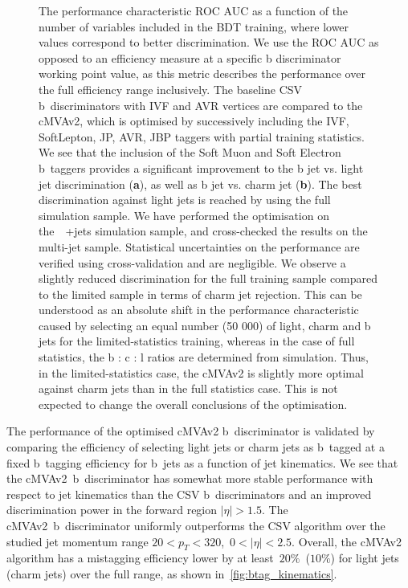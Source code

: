 \begin{figure}
\begin{centering}
\caption[The cMVAv2 performance as a function of training variables.]{The performance characteristic ROC AUC as a function of the number of variables included in the BDT training, where lower values correspond to better discrimination. We use the ROC AUC as opposed to an efficiency measure at a specific b discriminator working point value, as this metric describes the performance over the full efficiency range inclusively. The baseline CSV b~discriminators with IVF and AVR vertices are compared to the cMVAv2, which is optimised by successively including the IVF, SoftLepton, JP, AVR, JBP taggers with partial training statistics. We see that the inclusion of the Soft Muon and Soft Electron b~taggers provides a significant improvement to the b jet vs. light jet discrimination (\textbf{a}), as well as b jet vs. charm jet (\textbf{b}). The best discrimination against light jets is reached by using the full simulation sample. We have performed the optimisation on the~\ttbar~+jets simulation sample, and cross-checked the results on the multi-jet sample. Statistical uncertainties on the performance are verified using cross-validation and are negligible. We observe a slightly reduced discrimination for the full training sample compared to the limited sample in terms of charm jet rejection. This can be understood as an absolute shift in the performance characteristic caused by selecting an equal number (50 000) of light, charm and b jets for the limited-statistics training, whereas in the case of full statistics, the b : c : l ratios are determined from simulation. Thus, in the limited-statistics case, the cMVAv2 is slightly more optimal against charm jets than in the full statistics case. This is not expected to change the overall conclusions of the optimisation.}
\label{fig:btag_cmva_roc}
\end{centering}
\end{figure}

The performance of the optimised cMVAv2 b~discriminator is validated by comparing the efficiency of selecting light jets or charm jets as b~tagged at a fixed b~tagging efficiency for b~jets as a function of jet kinematics. We see that the cMVAv2~b~discriminator has somewhat more stable performance with respect to jet kinematics than the CSV b~discriminators and an improved discrimination power in the forward region $|\eta| > 1.5$. The cMVAv2~b~discriminator uniformly outperforms the CSV algorithm over the studied jet momentum range $20 < p_T < 320$,~$0 < |\eta| < 2.5$. Overall, the cMVAv2 algorithm has a mistagging efficiency lower by at least~$20\%$~($10\%$) for light jets (charm jets) over the full range, as shown in~\cref{fig:btag_kinematics}.

